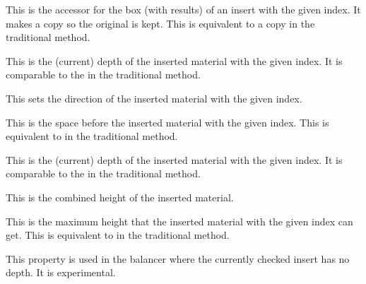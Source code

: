 \stopnewprimitive

\startnewprimitive[title={\prm {insertcopy}}]

This is the accessor for the box (with results) of an insert with the given
index. It makes a copy so the original is kept. This is equivalent to a \prm
{copy} in the traditional method.

\stopnewprimitive

\startnewprimitive[title={\prm {insertdepth}}]

This is the (current) depth of the inserted material with the given index. It is
comparable to the  in the traditional method.

\stopnewprimitive

\startnewprimitive[title={\prm {insertdirection}}]

This sets the direction of the inserted material with the given index.

\stopnewprimitive

\startnewprimitive[title={\prm {insertdistance}}]

This is the space before the inserted material with the given index. This is
equivalent to  in the traditional method.

\stopnewprimitive

\startnewprimitive[title={\prm {insertheight}}]

This is the (current) depth of the inserted material with the given index. It is
comparable to the  in the traditional method.

\stopnewprimitive

\startnewprimitive[title={\prm {insertheights}}]

This is the combined height of the inserted material.

\stopnewprimitive

\startnewprimitive[title={\prm {insertlimit}}]

This is the maximum height that the inserted material with the given index can
get. This is equivalent to  in the traditional method.

\stopnewprimitive

\startnewprimitive[title={\prm {insertlinedepth}}]

This property is used in the balancer where the currently checked insert has no
depth. It is experimental.

\stopnewprimitive

\startnewprimitive[title={\prm {insertlineheight}}]

